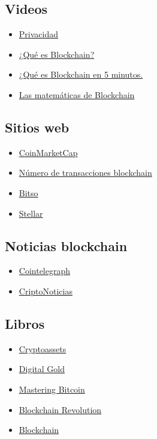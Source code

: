 \documentclass[a4paper,12pt]{/home/armando/Documentos/Cursos/LaTeX/Plantillas/lib/pub}
\begin{document}
	\subsection{Videos}
	\begin{itemize}
		\item \href{https://www.youtube.com/watch?v=RSj9QQMPMWg}{Privacidad}
		\item \href{https://www.youtube.com/watch?v=E2QT9RHmNsY}{¿Qué es Blockchain?}	
		\item \href{https://www.youtube.com/watch?v=Yn8WGaO\_\_ak\&list=PLgo3Qtdm2bOMKyzFGy-B3MiDAGPIeqbKP\&index=2}{¿Qué es Blockchain en 5 minutos.}
		\item \href{https://www.youtube.com/watch?v=b5dhq3dSG2k}{Las matemáticas de Blockchain}
	\end{itemize}
	\subsection{Sitios web}
	\begin{itemize}
		\item \href{https://coinmarketcap.com/}{CoinMarketCap}
		\item \href{https://www.blockchain.com/charts/n-transactions?timespan=all}{Número de transacciones blockchain}
		\item \href{https://bitso.com/}{Bitso}
		\item \href{https://www.stellar.org/}{Stellar}
	\end{itemize}
	\subsection{Noticias blockchain}
	\begin{itemize}
		\item \href{https://es.cointelegraph.com/}{Cointelegraph}
		\item \href{https://www.criptonoticias.com/}{CriptoNoticias}
	\end{itemize}
	\subsection{Libros}
	\begin{itemize}
		\item \href{https://drive.google.com/file/d/1l-xFaEFFofdnR2wLG76BMCQshgO-MUmB/view?usp=sharing}{Cryptoassets}
		\item \href{https://drive.google.com/file/d/10s1wkh4-nIWxL4mpUM\_vag\_tLxgiellL/view?usp=sharing}{Digital Gold}
		\item \href{https://drive.google.com/file/d/1lXzrKNbJP3V31rd2xHozct1D7vhxqRSN/view?usp=sharing}{Mastering Bitcoin}
		\item \href{https://drive.google.com/file/d/1CjxOQhFaoLQbnxOJEg3o\_DVQcRmmWld3/view?usp=sharing}{Blockchain Revolution}
		\item \href{https://drive.google.com/file/d/1aCVkcd6CdhcTYdfXgkaPOyo2LKv8GeTF/view?usp=sharing}{Blockchain}
	\end{itemize}
\end{document}
